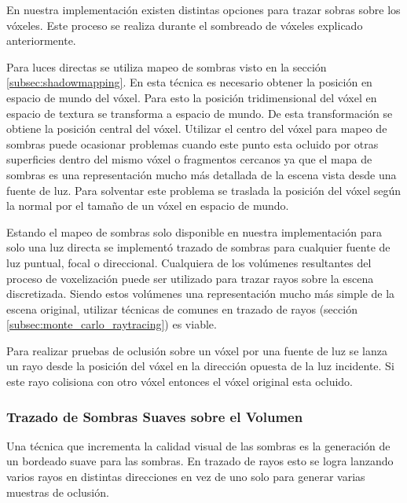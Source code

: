 En nuestra implementación existen distintas opciones para trazar sobras sobre los vóxeles. Este proceso se realiza durante el sombreado de vóxeles explicado anteriormente.

Para luces directas se utiliza mapeo de sombras visto en la sección \ref{subsec:shadowmapping}. En  esta técnica es necesario obtener la posición en espacio de mundo del vóxel. Para esto la posición tridimensional del vóxel en espacio de textura se transforma a espacio de mundo. De esta transformación se obtiene la posición central del vóxel. Utilizar el centro del vóxel para mapeo de sombras puede ocasionar problemas cuando este punto esta ocluido por otras superficies dentro del mismo vóxel o fragmentos cercanos ya que el mapa de sombras es una representación mucho más detallada de la escena vista desde una fuente de luz. Para solventar este problema se traslada la posición del vóxel según la normal por el tamaño de un vóxel en espacio de mundo.

Estando el mapeo de sombras solo disponible en nuestra implementación para solo una luz directa se implementó trazado de sombras para cualquier fuente de luz puntual, focal o direccional. Cualquiera de los volúmenes resultantes del proceso de voxelización puede ser utilizado para trazar rayos sobre la escena discretizada. Siendo estos volúmenes una representación mucho más simple de la escena original, utilizar técnicas de comunes en trazado de rayos (sección \ref{subsec:monte_carlo_raytracing}) es viable.

Para realizar pruebas de oclusión sobre un vóxel por una fuente de luz se lanza un rayo desde la posición del vóxel en la dirección opuesta de la luz incidente. Si este rayo colisiona con otro vóxel entonces el vóxel original esta ocluido.

\subsubsection{Trazado de Sombras Suaves sobre el Volumen}

Una técnica que incrementa la calidad visual de las sombras es la generación de un bordeado suave para las sombras. En trazado de rayos esto se logra lanzando varios rayos en distintas direcciones en vez de uno solo para generar varias muestras de oclusión.

